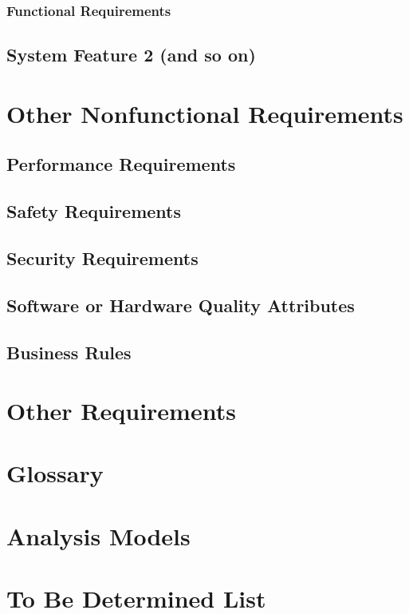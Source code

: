 \documentclass[english]{article}
\numberwithin{equation}{section} %
\begin{document}
\subsubsection{Functional Requirements}



\subsection{System Feature 2 (and so on)}




\newpage
\section{Other Nonfunctional Requirements}
\subsection{Performance Requirements}
\subsection{Safety Requirements}
\subsection{Security Requirements}
\subsection{Software or Hardware Quality Attributes}
\subsection{Business Rules}

\newpage
\section{Other Requirements}
\appendix
\section{Glossary}
\section{Analysis Models}
\section{To Be Determined List}
\end{document}
